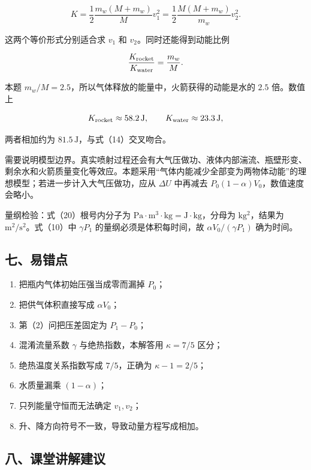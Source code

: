 \documentclass[12pt,a4paper,UTF8]{ctexart}
\newcommand{\tightlist}{\setlength{\itemsep}{0pt}\setlength{\parskip}{0pt}}
\begin{document}
\[
K
=\frac12\frac{m_w(M+m_w)}{M}v_1^2
=\frac12\frac{M(M+m_w)}{m_w}v_2^2.
\]

这两个等价形式分别适合求 \(v_1\) 和 \(v_2\)。同时还能得到动能比例

\[
\frac{K_{\rm rocket}}{K_{\rm water}}
=\frac{m_w}{M}.
\]

本题 \(m_w/M=2.5\)，所以气体释放的能量中，火箭获得的动能是水的 \(2.5\)
倍。数值上

\[
K_{\rm rocket}\approx58.2\,\mathrm J,
\qquad
K_{\rm water}\approx23.3\,\mathrm J,
\]

两者相加约为 \(81.5\,\mathrm J\)，与式（14）交叉吻合。

需要说明模型边界。真实喷射过程还会有大气压做功、液体内部湍流、瓶壁形变、剩余水和火箭质量变化等效应。本题采用``气体内能减少全部变为两物体动能''的理想模型；若进一步计入大气压做功，应从
\(\Delta U\) 中再减去 \(P_0(1-\alpha)V_0\)，数值速度会略小。

量纲检验：式（20）根号内分子为
\(\mathrm{Pa\cdot m^3\cdot kg}=\mathrm{J\cdot kg}\)，分母为
\(\mathrm{kg^2}\)，结果为 \(\mathrm{m^2/s^2}\)。式（10）中
\(\gamma P_1\) 的量纲必须是体积每时间，故 \(\alpha V_0/(\gamma P_1)\)
确为时间。

\subsection{七、易错点}\label{ux4e03ux6613ux9519ux70b9-6}

\begin{enumerate}
\def\labelenumi{\arabic{enumi}.}
\tightlist
\item
  把瓶内气体初始压强当成零而漏掉 \(P_0\)；
\item
  把供气体积直接写成 \(\alpha V_0\)；
\item
  第（2）问把压差固定为 \(P_1-P_0\)；
\item
  混淆流量系数 \(\gamma\) 与绝热指数，本解答用 \(\kappa=7/5\) 区分；
\item
  绝热温度关系指数写成 \(7/5\)，正确为 \(\kappa-1=2/5\)；
\item
  水质量漏乘 \((1-\alpha)\)；
\item
  只列能量守恒而无法确定 \(v_1,v_2\)；
\item
  升、降方向符号不一致，导致动量方程写成相加。
\end{enumerate}

\subsection{八、课堂讲解建议}\label{ux516bux8bfeux5802ux8bb2ux89e3ux5efaux8bae-6}
\end{document}
